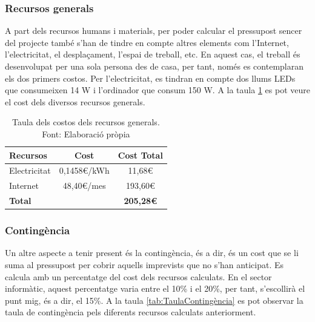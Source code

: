\documentclass[a4paper]{article}
\begin{document}
\subsubsection{Recursos generals}
A part dels recursos humans i materials, per poder calcular el pressupost sencer del projecte també s'han de tindre en compte altres elements com l'Internet, l'electricitat, el desplaçament, l'espai de treball, etc. En aquest cas, el treball és desenvolupat per una sola persona des de casa, per tant, només es contemplaran els dos primers costos. Per l'electricitat, es tindran en compte dos llums LEDs que consumeixen 14 W i l'ordinador que consum 150 W. A la taula \ref{tab:TaulaCostosGenerals} es pot veure el cost dels diversos recursos generals.

\begin{table}[H]
    \begin{center}
        \begin{tabular}{|l|c|c|}
            \hline
            \rowcolor[HTML]{9B9B9B} 
            {\color[HTML]{000000} \textbf{Recursos}} & {\color[HTML]{000000} \textbf{Cost}} & {\color[HTML]{000000} \textbf{Cost Total}} \\ \hline
            Electricitat                             & 0,1458€/kWh                          & 11,68€                                     \\ \hline
            Internet                                 & 48,40€/mes                           & 193,60€                                    \\ \hline
            \rowcolor[HTML]{C0C0C0} 
            {\color[HTML]{000000} \textbf{Total}}    & {\color[HTML]{000000} \textbf{}}     & {\color[HTML]{000000} \textbf{205,28€}}    \\ \hline
        \end{tabular}
        \caption[Taula dels costos dels recursos generals]{Taula dels costos dels recursos generals. Font: Elaboració pròpia}
        \label{tab:TaulaCostosGenerals}
    \end{center}
\end{table}

\subsubsection{Contingència}
Un altre aspecte a tenir present és la contingència, és a dir, és un cost que se li suma al pressupost per cobrir aquells imprevists que no s'han anticipat. Es calcula amb un percentatge del cost dels recursos calculats. En el sector informàtic, aquest percentatge varia entre el 10\% i el 20\%, per tant, s'escollirà el punt mig, és a dir, el 15\%. A la taula \ref{tab:TaulaContingència} es pot observar la taula de contingència pels diferents recursos calculats anteriorment.
\end{document}
